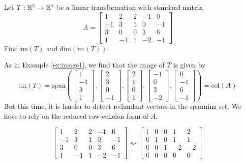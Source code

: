 \documentclass{ximera}
\begin{document}
\begin{example}\label{ex:image2}
Let $T:\mathbb{R}^5\rightarrow \mathbb{R}^4$ be a linear transformation with standard matrix $$A=\begin{bmatrix}1 & 2 & 2 &-1 & 0\\-1 & 3 & 1 & 0 & -1\\3 & 0 & 0 & 3 & 6\\ 1 & -1 & 1 & -2 & -1\end{bmatrix}$$
Find $\mbox{im}(T)$ and $\mbox{dim}(\mbox{im}(T))$.
\begin{explanation}
As in Example \ref{ex:image1}, we find that the image of $T$ is given by
$$\mbox{im}(T)=\mbox{span}\left(\begin{bmatrix}1\\-1\\3\\1\end{bmatrix}, \begin{bmatrix}2\\3\\0\\-1\end{bmatrix}, \begin{bmatrix}2\\1\\0\\1\end{bmatrix}, \begin{bmatrix}-1\\0\\3\\-2\end{bmatrix}, \begin{bmatrix}0\\-1\\6\\-1\end{bmatrix}\right)=\mbox{col}(A)$$
But this time, it is harder to detect redundant vectors in the spanning set.  We have to rely on the reduced row-echelon form of $A$.

$$\begin{bmatrix}1 & 2 & 2 &-1 & 0\\-1 & 3 & 1 & 0 & -1\\3 & 0 & 0 & 3 & 6\\ 1 & -1 & 1 & -2 & -1\end{bmatrix}  \rightsquigarrow \begin{bmatrix} 1 & 0 & 0 & 1 & 2\\0 & 1 & 0 & 1 & 1\\0 & 0 & 1 & -2 & -2\\ 0 & 0 & 0 & 0 & 0 \end{bmatrix}$$


\end{explanation}
\end{example}
\end{document}
